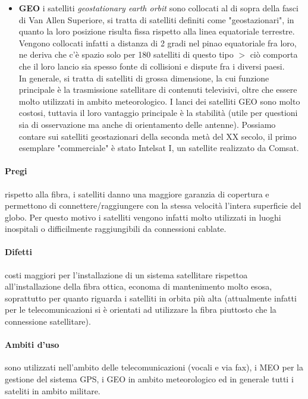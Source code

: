 \documentclass{article}
\begin{document}
\begin{itemize}
\item \textbf{GEO} i satelliti \textit{geostationary earth orbit} sono collocati
al di sopra della fasci di Van Allen Superiore, si tratta di satelliti definiti
come "geostazionari", in quanto la loro posizione risulta fissa rispetto alla
linea equatoriale terrestre. Vengono collocati infatti a distanza di 2 gradi nel
pinao equatoriale fra loro, ne deriva che c'è spazio solo per 180 satelliti di
questo tipo $>$ ciò comporta che il loro lancio sia spesso fonte di collisioni e
dispute fra i diversi paesi. \\
In generale, si tratta di satelliti di grossa dimensione, la cui funzione
principale è la trasmissione satellitare di contenuti televisivi, oltre che
essere molto utilizzati in ambito meteorologico. I lanci dei satelliti GEO sono
molto costosi, tuttavia il loro vantaggio principale è la stabilità (utile per
questioni sia di osservazione ma anche di orientamento delle antenne). Possiamo
contare sui satelliti geostazionari della seconda metà del XX secolo, il primo
esemplare "commerciale" è stato Intelsat I, un satellite realizzato da Comsat.
\end{itemize}

\paragraph{Pregi} rispetto alla fibra, i satelliti danno una maggiore garanzia
di copertura e permettono di connettere/raggiungere con la stessa velocità
l'intera superficie del globo. Per questo motivo i satelliti vengono infatti
molto utilizzati in luoghi inospitali o difficilmente raggiungibili da
connessioni cablate.

\paragraph{Difetti} costi maggiori per l'installazione di un sistema satellitare
rispettoa all'installazione della fibra ottica, economa di mantenimento molto
esosa, soprattutto per quanto riguarda i satelliti in orbita più alta
(attualmente infatti per le telecomunicazioni si è orientati ad utilizzare la
fibra piuttosto che la connessione satellitare).

\paragraph{Ambiti d'uso} sono utilizzati nell'ambito delle telecomunicazioni
(vocali  e via fax), i MEO per la gestione del sistema GPS, i GEO in ambito
meteorologico ed in generale tutti i sateliti in ambito militare.
\end{document}
